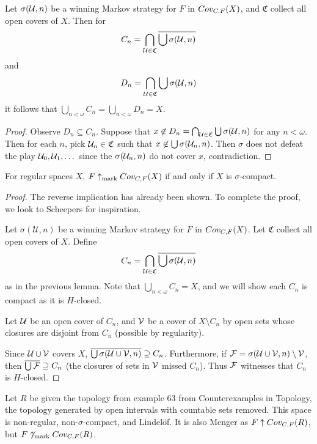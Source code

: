   \begin{lemma}
    Let $\sigma(\mathcal{U}, n)$ be a winning Markov strategy for $F$ in $Cov_{C,F}(X)$, and $\mathfrak{C}$ collect all open covers of $X$. Then for
      \[
        C_n = \bigcap_{\mathcal{U}\in\mathfrak{C}} \overline{\bigcup\sigma(\mathcal{U},n)}
      \]
    and
      \[
        D_n = \bigcap_{\mathcal{U}\in\mathfrak{C}} \bigcup\sigma(\mathcal{U},n)
      \]
    it follows that $\bigcup_{n<\omega} C_n = \bigcup_{n<\omega} D_n = X$.
  \end{lemma}

  \begin{proof}
    Observe $D_n \subseteq C_n$. Suppose that $x \not\in D_n = \bigcap_{\mathcal{U}\in\mathfrak{C}} \bigcup\sigma(\mathcal{U},n)$ for any $n<\omega$. Then for each $n$, pick $\mathcal{U}_n\in\mathfrak{C}$ such that $x\not\in \bigcup\sigma(\mathcal{U}_n,n)$. Then $\sigma$ does not defeat the play $\mathcal{U}_0,\mathcal{U}_1,\dots$ since the $\sigma(\mathcal{U}_n,n)$ do not cover $x$, contradiction.
  \end{proof}

  \begin{theorem}
    For regular spaces $X$, $F \uparrow_{\text{mark}} Cov_{C,F}(X)$ if and only if $X$ is $\sigma$-compact.
  \end{theorem}

  \begin{proof}
    The reverse implication has already been shown. To complete the proof, we look to Scheepers for inspiration.

    Let $\sigma(\mathcal{U},n)$ be a winning Markov strategy for $F$ in $Cov_{C,F}(X)$. Let $\mathfrak{C}$ collect all open covers of $X$. Define
      \[
        C_n = \bigcap_{\mathcal{U}\in\mathfrak{C}} \overline{\bigcup\sigma(\mathcal{U},n)}
      \]
    as in the previous lemma. Note that $\bigcup_{n<\omega} C_n = X$, and we will show each $C_n$ is compact as it is $H$-closed.

    Let $\mathcal{U}$ be an open cover of $C_n$, and $\mathcal{V}$ be a cover of $X\setminus C_n$ by open sets whose closures are disjoint from $C_n$ (possible by regularity).

    Since $\mathcal{U}\cup\mathcal{V}$ covers $X$, $\overline{\bigcup\sigma(\mathcal{U}\cup\mathcal{V},n)} \supseteq C_n$. Furthermore, if $\mathcal{F} = \sigma(\mathcal{U}\cup\mathcal{V},n)\setminus \mathcal{V}$, then $\overline{\bigcup\mathcal{F}} \supseteq C_n$ (the closures of sets in $\mathcal{V}$ missed $C_n$). Thus $\mathcal{F}$ witnesses that $C_n$ is $H$-closed.
  \end{proof}

  \begin{example}
  Let $R$ be given the topology from example 63 from Counterexamples in Topology, the topology generated by open intervals with countable sets removed. This space is non-regular, non-$\sigma$-compact, and Lindel\"of. It is also Menger as $F \uparrow Cov_{C,F}(R)$, but $F \not\uparrow_{\text{mark}} Cov_{C,F}(R)$.
  \end{example}

